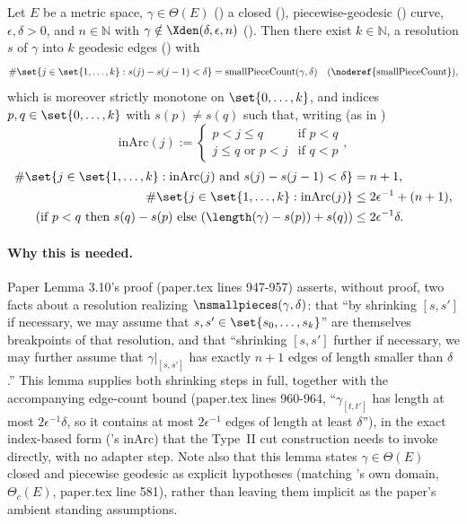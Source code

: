 \begin{lemma}
  Let $E$ be a metric space, $\gamma \in \Theta(E)$ () a closed
  (), piecewise-geodesic () curve, $\epsilon,
  \delta > 0$, and $n \in \mathbb{N}$ with $\gamma \notin \Xden(\delta,\epsilon,n)$
  (). Then there exist $k \in \mathbb{N}$, a resolution $s$ of $\gamma$ into
  $k$ geodesic edges () with
  \[
    \#\set{j\in\set{1,\dots,k} : s(j)-s(j-1)<\delta} = \mathrm{smallPieceCount}(\gamma,\delta)
    \quad\text{(\noderef{smallPieceCount})}
    ,
  \]
  which is moreover strictly monotone on $\set{0,\dots,k}$, and indices $p,q \in \set{0,\dots,k}$
  with $s(p) \ne s(q)$ such that, writing (as in )
  \[
    \mathrm{inArc}(j) :=
    \begin{cases}
      p<j\le q & \text{if } p<q \\
      j\le q \text{ or } p<j & \text{if } q<p
    \end{cases}
    ,
  \]
  \begin{align}
    \label{eq:exact-n1}
    \#\set{j\in\set{1,\dots,k} : \mathrm{inArc}(j) \text{ and } s(j)-s(j-1)<\delta} &= n+1 ,\\
    \label{eq:total-bound}
    \#\set{j\in\set{1,\dots,k} : \mathrm{inArc}(j)} &\le 2\epsilon^{-1} + (n+1) ,\\
    \label{eq:arc-length}
    \left(\text{if } p<q \text{ then } s(q)-s(p) \text{ else } (\length(\gamma)-s(p))+s(q)\right)
      &\le 2\epsilon^{-1}\delta .
  \end{align}

  \paragraph{Why this is needed.} Paper Lemma 3.10's proof (paper.tex lines 947-957) asserts,
  without proof, two facts about a resolution realizing $\nsmallpieces(\gamma,\delta)$: that
  ``by shrinking $[s,s']$ if necessary, we may assume that $s,s' \in \set{s_0,\dots,s_k}$'' are
  themselves breakpoints of that resolution, and that ``shrinking $[s,s']$ further if necessary,
  we may further assume that $\gamma|_{[s,s']}$ has exactly $n+1$ edges of length smaller than
  $\delta$.'' This lemma supplies both shrinking steps in full, together with the accompanying
  edge-count bound (paper.tex lines 960-964, ``$\gamma_{[t,t']}$ has length at most
  $2\epsilon^{-1}\delta$, so it contains at most $2\epsilon^{-1}$ edges of length at least
  $\delta$''), in the exact index-based form ('s
  $\mathrm{inArc}$) that the Type~II cut construction needs to invoke
   directly, with no adapter step. Note also that this
  lemma states $\gamma \in \Theta(E)$ closed and piecewise geodesic as explicit hypotheses (matching
  's own domain, $\Theta_c(E)$, paper.tex line 581), rather than leaving them
  implicit as the paper's ambient standing assumptions.


\end{lemma}

